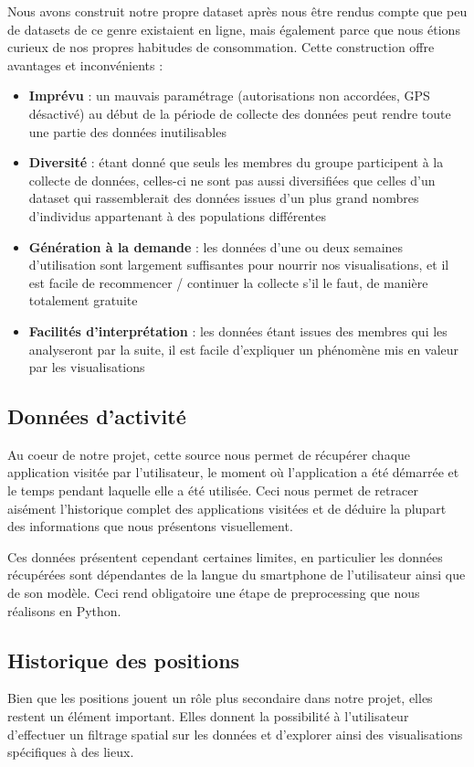 \documentclass[a4paper, 11pt]{article}
\begin{document}
        Nous avons construit notre propre dataset après nous être rendus compte que peu de datasets de ce genre existaient en ligne, mais également parce que nous étions curieux de nos propres habitudes de consommation. Cette construction offre avantages et inconvénients :
        \begin{itemize}
            \item \textbf{\color{red} Imprévu} : un mauvais paramétrage (autorisations non accordées, GPS désactivé) au début de la période de collecte des données peut rendre toute une partie des données inutilisables
            \item \textbf{\color{red} Diversité} : étant donné que seuls les membres du groupe participent à la collecte de données, celles-ci ne sont pas aussi diversifiées que celles d'un dataset qui rassemblerait des données issues d'un plus grand nombres d'individus appartenant à des populations différentes
            \item \textbf{\color{green} Génération à la demande} : les données d'une ou deux semaines d'utilisation sont largement suffisantes pour nourrir nos visualisations, et il est facile de recommencer / continuer la collecte s'il le faut, de manière totalement gratuite
            \item \textbf{\color{green} Facilités d'interprétation} : les données étant issues des membres qui les analyseront par la suite, il est facile d'expliquer un phénomène mis en valeur par les visualisations
        \end{itemize}

        \subsection{Données d'activité}
        Au coeur de notre projet, cette source nous permet de récupérer chaque application visitée par l'utilisateur, le moment où l'application a été démarrée et le temps pendant laquelle elle a été utilisée. Ceci nous permet de retracer aisément l'historique complet des applications visitées et de déduire la plupart des informations que nous présentons visuellement.

        Ces données présentent cependant certaines limites, en particulier les données récupérées sont dépendantes de la langue du smartphone de l'utilisateur ainsi que de son modèle. Ceci rend obligatoire une étape de preprocessing que nous réalisons en Python.

        \subsection{Historique des positions}
        Bien que les positions jouent un rôle plus secondaire dans notre projet, elles restent un élément important. Elles donnent la possibilité à l'utilisateur d'effectuer un filtrage spatial sur les données et d'explorer ainsi des visualisations spécifiques à des lieux.
\end{document}
